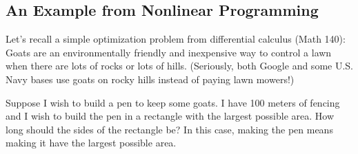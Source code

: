 \subsection{An Example from Nonlinear Programming}
Let's recall a simple optimization problem from differential calculus (Math 140): Goats are an environmentally friendly and inexpensive way to control a lawn when there are lots of rocks or lots of hills. (Seriously, both Google and some U.S. Navy bases use goats on rocky hills instead of paying lawn mowers!) 

Suppose I wish to build a pen to keep some goats. I have 100 meters of fencing and I wish to build the pen in a rectangle with the largest possible area. How long should the sides of the rectangle be? In this case, making the pen  means making it have the largest possible area.

